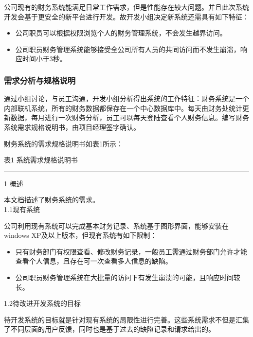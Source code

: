 \documentclass[UTF8,nofonts]{ctexart}
\begin{document}
公司现有的财务系统能满足日常工作需求，但是性能存在较大问题。并且此次系统开发会基于更安全的新平台进行开发。故开发小组决定新系统还需具有如下特征：
\begin{itemize}
\setlength{\itemsep}{0pt}
\setlength{\parskip}{0pt}
\setlength{\parsep}{0pt}
	\item 公司职员可以根据权限浏览个人的财务管理系统，不会发生越界访问。
	\item 公司职员财务管理系统能够接受全公司所有人员的共同访问而不发生崩溃，响应时间小于3秒。
\end{itemize}

\subsubsection{需求分析与规格说明}

通过小组讨论，与员工沟通，开发小组分析得出系统的工作特征：财务系统是一个内部联机系统，所有的财务数据都保存在一个中心数据库中。每天由财务处统计更新数据，每月进行一次财务分析，员工可以每天登陆查看个人财务信息。编写财务系统需求规格说明书，由项目经理签字确认。

财务系统的需求规格说明书如表1所示：\\
\begin{center}
	表1 系统需求规格说明书
\end{center}
\noindent\rule[0.25\baselineskip]{\textwidth}{2pt}
1 概述

本文档描述了财务系统的需求。\\
1.1现有系统

公司利用现有系统可以完成基本财务记录、系统基于图形界面，能够安装在windows XP及以上版本，但现有系统有如下限制：
\begin{itemize}
\setlength{\itemsep}{0pt}
\setlength{\parskip}{0pt}
\setlength{\parsep}{0pt}
	\item 只有财务部门有权限查看、修改财务记录，一般员工需通过财务部门允许才能查看个人信息，且存在可一次查看多人信息的缺陷。
	\item 公司职员财务管理系统在大批量的访问下有发生崩溃的可能，且响应时间较长。
\end{itemize}
1.2待改进开发系统的目标

待开发系统的目标就是针对现有系统的局限性进行完善。这些系统需求不但是汇集了不同层面的用户反馈，同时也是基于过去的缺陷记录和请求给出的。
\end{document}
